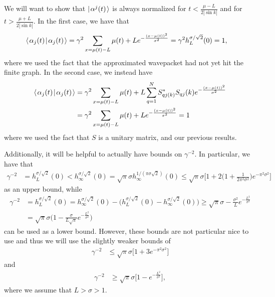 \documentclass[../thesis-main/thesis-main]{subfiles}
\begin{document}
We will want to show that $|\mspace{2mu} \alpha^j(t) \mspace{2mu} \rangle$ is always normalized for $t < \frac{\mu - L}{2|\sin k|}$ and for $t > \frac{\mu + L}{2|\sin k|}$.  In the first case, we have that 
\begin{align}
   \langle\mspace{2mu} \alpha_j(t) \mspace{2mu} | \mspace{2mu} \alpha_j(t)\mspace{2mu} \rangle &= \gamma^2 \sum_{x = \mu(t) - L}{\mu(t) + L} e^{ -\frac{(x-\mu(t))^2}{\sigma^2}} = \gamma^2 h_{L}^{\sigma/\sqrt{2}} (0) = 1,
\end{align}
where we used the fact that the approximated wavepacket had not yet hit the finite graph.  In the second case, we instead have
\begin{align}
  \langle\mspace{2mu} \alpha_j(t) \mspace{2mu} | \mspace{2mu} \alpha_j(t)\mspace{2mu} \rangle &= \gamma^2 \sum_{x = \mu(t) - L}{\mu(t) + L} \sum_{q = 1}^N S_{qj(k)}^*S_{qj}(k) e^{ -\frac{(x-\mu(t))^2}{\sigma^2}} \\
   &= \gamma^2 \sum_{x = \mu(t) - L}{\mu(t) + L}  e^{ -\frac{(x-\mu(t))^2}{\sigma^2}} = 1
\end{align}
where we used the fact that $S$ is a unitary matrix, and our previous results.  

Additionally, it will be helpful to actually have bounds on $\gamma^{-2}$.  In particular, we have that
\begin{align}
  \gamma^{-2} &= h_{L}^{\sigma/\sqrt{2}}(0)   < h_{\infty}^{\sigma/\sqrt{2}}(0)
     = \sqrt{\pi} \sigma h_{\infty}^{1/(\pi \sigma \sqrt{2})} (0)
     \leq \sqrt{\pi} \sigma \Big[ 1 + 2 \Big( 1 + \frac{1}{2\pi^2\sigma^2}\Big) e^{ - \pi^2\sigma^2}\Big]
\end{align}
as an upper bound, while
\begin{align}
  \gamma^{-2} &= h_{L}^{\sigma/\sqrt{2}}(0) = h_{\infty}^{\sigma/\sqrt{2}}(0) - \big( h_{L}^{\sigma/\sqrt{2}}(0) - h_\infty^{\sigma/\sqrt{2}}(0)\big) \geq \sqrt{\pi} \sigma - \frac{\sigma^2}{L} e^{-\frac{L^2}{\sigma^2}} \\
   &= \sqrt{\pi} \sigma \Big(1 - \frac{\sigma}{L\sqrt{\pi}} e^{ - \frac{L^2}{\sigma^2}}\Big) 
\end{align}
can be used as a lower bound.  However, these bounds are not particular nice to use and thus we will use the slightly weaker bounds of
\begin{align}
  \gamma^{-2} & \leq \sqrt{\pi}\sigma \big[ 1 + 3 e^{-\pi^2 \sigma^2}\big]\label{eq:gaussian_gamma_upper_bound}
\end{align}
and
\begin{align}
  \gamma^{-2} & \geq \sqrt{\pi} \sigma \big[ 1 - e^{-\frac{L^2}{\sigma^2}}\big],\label{eq:gaussian_gamma_lower_bound}
\end{align}
where we assume that $L > \sigma > 1$.
\end{document}
